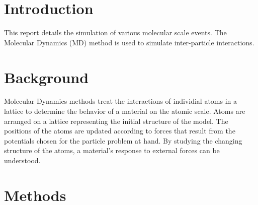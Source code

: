 \documentclass[11pt,twocolumn]{report}
\begin{document}
    \title{}
    \author{Bruce Berry}
    \maketitle

    \section{Introduction}
    This report details the simulation of various molecular scale events.  The Molecular Dynamics (MD) method is used to simulate inter-particle interactions.

    \section{Background}
    Molecular Dynamics methods treat the interactions of individial atoms in a lattice to determine the behavior of a material on the atomic scale.  Atoms are arranged on a lattice representing the initial structure of the model.  The positions of the atoms are updated according to forces that result from the potentials chosen for the particle problem at hand.  By studying the changing structure of the atoms, a material's response to external forces can be understood.

    \section{Methods}
\end{document}
